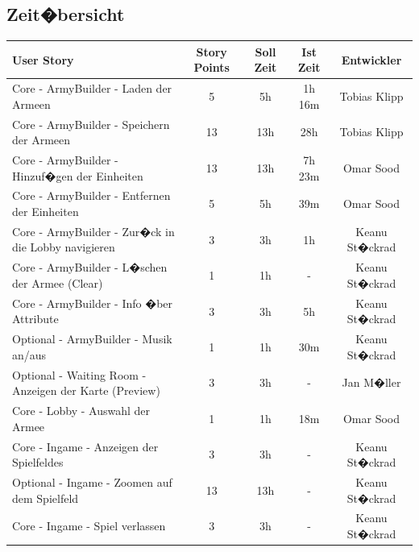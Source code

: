 \documentclass[12pt, titlepage]{scrartcl}
\begin{document}
		\subsection{Zeit�bersicht}
		\begin{center}
				\begin{longtable}{p{6cm} c c c c }
					
					User Story	& Story Points & Soll Zeit & Ist Zeit & Entwickler\\
					\toprule
					\endhead
					Core - ArmyBuilder - Laden der Armeen & 5 & 5h & 1h 16m & Tobias Klipp \\ \hline 
					
					Core - ArmyBuilder - Speichern der Armeen & 13 & 13h & 28h & Tobias Klipp\\ \hline
					
					Core - ArmyBuilder - Hinzuf�gen der Einheiten & 13 & 13h & 7h 23m & Omar Sood\\ \hline
					
					Core - ArmyBuilder - Entfernen der Einheiten & 5 & 5h & 39m & Omar Sood\\ \hline
					
					Core - ArmyBuilder - Zur�ck in die Lobby navigieren & 3 & 3h & 1h & Keanu St�ckrad\\ \hline
					
					Core - ArmyBuilder - L�schen der Armee (Clear) & 1 & 1h & - & Keanu St�ckrad\\ \hline
						
					Core - ArmyBuilder - Info �ber Attribute & 3 & 3h & 5h & Keanu St�ckrad\\ \hline
					
					Optional - ArmyBuilder - Musik an/aus & 1 & 1h & 30m & Keanu St�ckrad\\ \hline
					
					Optional - Waiting Room - Anzeigen der Karte (Preview) & 3 & 3h & - & Jan M�ller\\ \hline
					
					Core - Lobby - Auswahl der Armee  & 1 & 1h & 18m & Omar Sood\\ \hline
					
					Core - Ingame - Anzeigen der Spielfeldes & 3 & 3h & - &  Keanu St�ckrad\\ \hline
					
					Optional - Ingame - Zoomen auf dem Spielfeld & 13 & 13h & - & Keanu St�ckrad\\ \hline
					
					Core - Ingame - Spiel verlassen & 3 & 3h & - & Keanu St�ckrad\\ \hline
					

\end{longtable}
\end{center}
\end{document}
